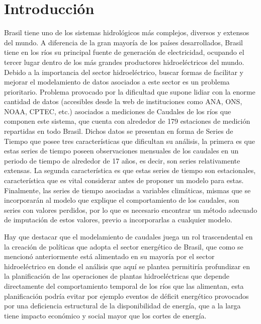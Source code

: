 \documentclass[12pt,oneside]{book}\usepackage[]{graphicx}\usepackage[]{color}
\theoremstyle{definition} %
\begin{document}
\mainmatter
\addtolength{\abovedisplayskip}{-1mm}
\addtolength{\belowdisplayskip}{-1mm}






\chapter{Introducción}\label{cap1}


Brasil tiene uno de los sistemas hidrológicos más complejos, diversos y extensos del mundo. A diferencia de la gran mayoría de los países desarrollados, Brasil tiene en los ríos su principal fuente de generación de electricidad, ocupando el tercer lugar dentro de los más grandes productores hidroeléctricos del mundo. Debido a la importancia del sector hidroeléctrico, buscar formas de facilitar y mejorar el modelamiento de datos asociados a este sector es un problema prioritario. Problema provocado por la dificultad que supone lidiar con la enorme cantidad de datos (accesibles desde la web de instituciones como ANA, ONS, NOAA, CPTEC, etc.) asociados a mediciones de Caudales de los ríos que componen este sistema, que cuenta con alrededor de 179 estaciones de medición repartidas en todo Brasil. Dichos datos se presentan en forma de Series de Tiempo que posee tres características que dificultan su análisis, la primera es que estas series de tiempo poseen observaciones mensuales de los caudales en un periodo de tiempo de alrededor de 17 años, es decir, son series relativamente extensas. La segunda característica es que estas series de tiempo son estacionales, característica que es vital considerar antes de proponer un modelo para estas. Finalmente, las series de tiempo asociadas a variables climáticas, mismas que se incorporarán al modelo que explique el comportamiento de los caudales, son series con valores perdidos, por lo que es necesario encontrar un método adecuado de imputación de estos valores, previo a incorporarlas a cualquier modelo.



Hay que destacar que el modelamiento de caudales juega un rol trascendental en la creación de políticas que adopta el sector energético de Brasil, que como se mencionó anteriormente está alimentado en su mayoría por el sector hidroeléctrico en donde el análisis que aquí se plantea permitiría profundizar en la planificación de las operaciones de plantas hidroeléctricas que depende directamente del comportamiento temporal de los ríos que las alimentan, esta planificación podría evitar por ejemplo eventos de déficit energético provocados por una deficiencia estructural de la disponibilidad de energía, que a la larga tiene impacto económico y social mayor que los cortes de energía.
\end{document}
